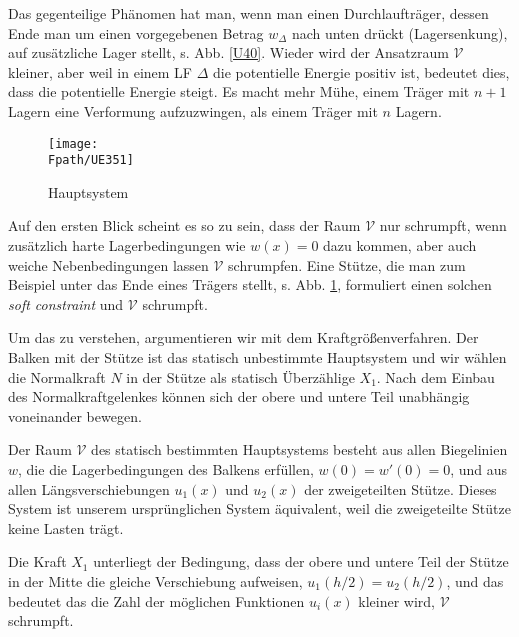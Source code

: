 {{{{{Das gegenteilige Ph\"{a}nomen hat man, wenn man einen Durchlauftr\"{a}ger, dessen Ende man um einen vorgegebenen Betrag $w_\Delta$ nach unten dr\"{u}ckt (Lagersenkung), auf zus\"{a}tzliche Lager stellt, s. Abb. \ref{U40}. Wieder wird der Ansatzraum $\mathcal{V}$ kleiner, aber weil in einem LF $\Delta$ die potentielle Energie positiv ist, bedeutet dies, dass die potentielle Energie steigt. Es macht mehr M\"{u}he, einem Tr\"{a}ger mit $n + 1$ Lagern eine Verformung aufzuzwingen, als einem Tr\"{a}ger mit $n$ Lagern.
\begin{figure}[tbp]
\centering
\if {} \sidecaption \fi
\texttt{[image: \\Fpath/UE351]}
\caption{Hauptsystem}
\label{UE351}
\end{figure}%

Auf den ersten Blick scheint es so zu sein, dass der Raum $\mathcal{V}$ nur schrumpft, wenn zus\"{a}tzlich \glq harte\grq{} Lagerbedingungen wie $w(x) = 0$ dazu kommen, aber auch \glq weiche\grq{} Nebenbedingungen lassen $\mathcal{V}$ schrumpfen. Eine St\"{u}tze, die man zum Beispiel unter das Ende eines Tr\"{a}gers stellt, s. Abb. \ref{UE351}, formuliert einen solchen {\em soft constraint\/} und $\mathcal{V}$ schrumpft.

Um das zu verstehen, argumentieren wir mit dem Kraftgr\"{o}{\ss}enverfahren. Der Balken mit der St\"{u}tze ist das statisch unbestimmte Hauptsystem und wir w\"{a}hlen die Normalkraft $N$ in der St\"{u}tze als statisch \"{U}berz\"{a}hlige $X_1$. Nach dem Einbau des Normalkraftgelenkes k\"{o}nnen sich der obere und untere Teil unabh\"{a}ngig voneinander bewegen.

Der Raum $\mathcal{V}$ des statisch bestimmten Hauptsystems besteht aus allen Biegelinien $w$, die die Lagerbedingungen des Balkens erf\"{u}llen, $w(0) = w'(0) = 0$, und aus allen L\"{a}ngsverschiebungen $u_1(x)$ und $u_2(x)$ der zweigeteilten St\"{u}tze.  Dieses System ist unserem urspr\"{u}nglichen System \"{a}quivalent, weil die zweigeteilte St\"{u}tze keine Lasten tr\"{a}gt.

Die Kraft $X_1$ unterliegt der Bedingung, dass der obere und untere Teil der St\"{u}tze in der Mitte die gleiche Verschiebung aufweisen, $u_1(h/2) = u_2(h/2)$, und das bedeutet das die Zahl der m\"{o}glichen Funktionen $u_i(x)$ kleiner wird, $\mathcal{V}$  schrumpft.

}}}}}
